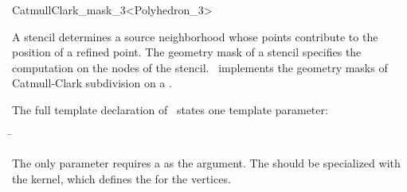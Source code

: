 
\ccRefPageBegin



\begin{ccRefClass}{CatmullClark_mask_3<Polyhedron_3>}

\ccDefinition

A stencil determines a source neighborhood 
whose points contribute to the position of a refined point.
The geometry mask of a stencil specifies
the computation on the nodes of the stencil.
\ccClassTemplateName\ implements the geometry masks of 
Catmull-Clark subdivision on a .


\ccParameters

The full template declaration of \ccClassTemplateName\ states one
template parameter:

\begin{tabbing}
 \= 
\end{tabbing}
   
The only parameter requires a  as the argument. The
 should be specialized with the 
kernel, which defines the  for the vertices.

\ccCreation
{}


\ccThreeToTwo



\end{ccRefClass}
